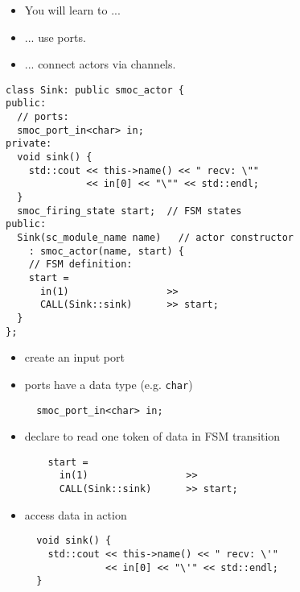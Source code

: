 \begin{frame}
\begin{itemize}
\item You will learn to ...
\item ... use ports.
\item ... connect actors via channels.
\end{itemize}
\end{frame}




\begin{frame}[fragile=singleslide]
\begin{lstlisting}
class Sink: public smoc_actor {
public:
  // ports:
  smoc_port_in<char> in;
private:
  void sink() {
    std::cout << this->name() << " recv: \""
              << in[0] << "\"" << std::endl;
  }
  smoc_firing_state start;  // FSM states
public:
  Sink(sc_module_name name)   // actor constructor
    : smoc_actor(name, start) {
    // FSM definition:
    start =
      in(1)                 >>
      CALL(Sink::sink)      >> start;
  }
};
\end{lstlisting}
\end{frame}






\begin{frame}[fragile=singleslide]
\begin{itemize}
\item create an input port
\item ports have a data type (e.g. \lstinline!char!)
\begin{lstlisting}
  smoc_port_in<char> in;
\end{lstlisting}
\item declare to read one token of data in FSM transition
\begin{lstlisting}
    start =
      in(1)                 >>
      CALL(Sink::sink)      >> start;
\end{lstlisting}
\item access data in action
\begin{lstlisting}
  void sink() {
    std::cout << this->name() << " recv: \'"
              << in[0] << "\'" << std::endl;
  }
\end{lstlisting}
\end{itemize}
\end{frame}




